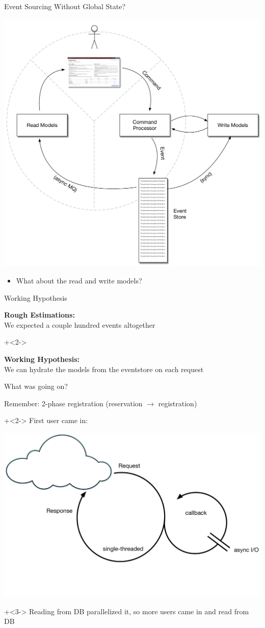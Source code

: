 \begin{frame}[fragile]{Event Sourcing Without Global State?}

\includegraphics[width=.5\textwidth]{../EventSourcing4_0.pdf}

\begin{itemize}
\item What about the read and write models?
\end{itemize}

\end{frame}

\begin{frame}[fragile]{Working Hypothesis}

\textbf{Rough Estimations:} \\[.7em]
We expected a couple hundred events altogether

\onslide+<2->
\vspace{5em}

\textbf{Working Hypothesis:} \\[.7em]
We can hydrate the models from the eventstore on each request

\end{frame}


\begin{frame}[fragile]{What was going on?}

\renewcommand{\SPACE}{.6em}

Remember: 2-phase registration (reservation $\rightarrow$ registration)
\vspace{\SPACE}

\onslide+<2->
First user came in:
\vspace{\SPACE}

\includegraphics[width=.5\textwidth]{../Nodejs3.pdf}

\onslide+<3->
Reading from DB parallelized it, so more users came in and read from DB

\end{frame}

